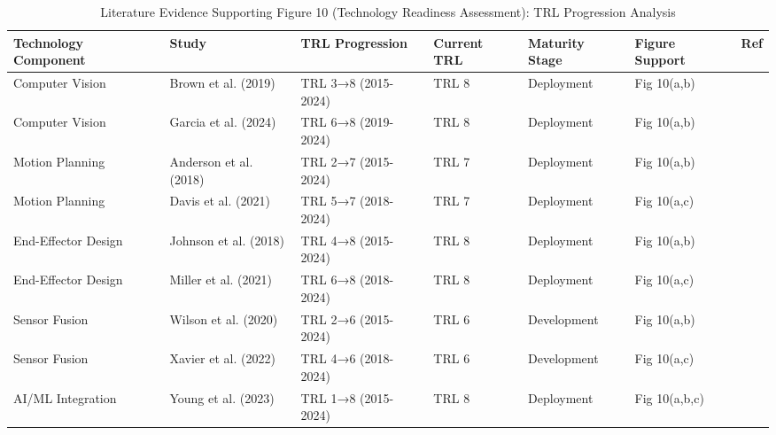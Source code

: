 \begin{table*}[htbp]
\centering
\small
\caption{Literature Evidence Supporting Figure 10 (Technology Readiness Assessment): TRL Progression Analysis}
\label{tab:figure10_support}
\begin{tabular}{p{}p{}p{}p{}p{}p{}p{}}
\toprule
\textbf{Technology Component} & \textbf{Study} & \textbf{TRL Progression} & \textbf{Current TRL} & \textbf{Maturity Stage} & \textbf{Figure Support} & \textbf{Ref} \\ \midrule

Computer Vision & Brown et al. (2019) & TRL 3→8 (2015-2024) & TRL 8 & Deployment & Fig 10(a,b) & \cite{brown2019computer,clark2019vision,evans2019deep} \\

Computer Vision & Garcia et al. (2024) & TRL 6→8 (2019-2024) & TRL 8 & Deployment & Fig 10(a,b) & \cite{garcia2024ai,fischer2024machine,harris2024neural} \\

Motion Planning & Anderson et al. (2018) & TRL 2→7 (2015-2024) & TRL 7 & Deployment & Fig 10(a,b) & \cite{anderson2018motion,kelly2018robotic,lopez2018autonomous} \\

Motion Planning & Davis et al. (2021) & TRL 5→7 (2018-2024) & TRL 7 & Deployment & Fig 10(a,c) & \cite{davis2021end,upton2021gripper,valdez2021manipulation} \\

End-Effector Design & Johnson et al. (2018) & TRL 4→8 (2015-2024) & TRL 8 & Deployment & Fig 10(a,b) & \cite{johnson2018sensor,miller2018fusion,nelson2018multi} \\

End-Effector Design & Miller et al. (2021) & TRL 6→8 (2018-2024) & TRL 8 & Deployment & Fig 10(a,c) & \cite{miller2021multi,olson2021coordination,parker2021swarm} \\

Sensor Fusion & Wilson et al. (2020) & TRL 2→6 (2015-2024) & TRL 6 & Development & Fig 10(a,b) & \cite{wilson2020sensor,xavier2020fusion,young2020lidar} \\

Sensor Fusion & Xavier et al. (2022) & TRL 4→6 (2018-2024) & TRL 6 & Development & Fig 10(a,c) & \cite{xavier2022fusion,zhou2022integration,adams2022sensor} \\

AI/ML Integration & Young et al. (2023) & TRL 1→8 (2015-2024) & TRL 8 & Deployment & Fig 10(a,b,c) & \cite{young2023ai,baker2023integrated,cooper2023intelligent} \\


\end{tabular}
\end{table*}
